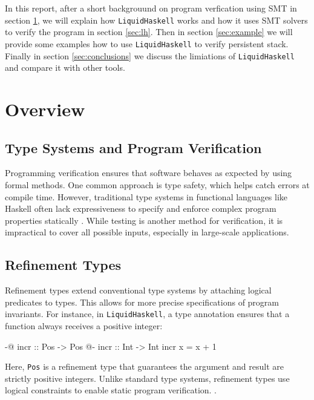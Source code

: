 \documentclass[]{rptuseminar}
\begin{document}
In this report, after a short backgrouund on program verfication using SMT in section \ref{sec:background}, we will explain 
how \texttt{LiquidHaskell} works and how it uses SMT solvers to 
verify the program in section \ref{sec:lh}. Then in section \ref{sec:example} we will provide some examples how to use 
\texttt{LiquidHaskell} to verify persistent stack. Finally in section \ref{sec:conclusions} we 
discuss the limiations of \texttt{LiquidHaskell} and compare it with other tools.


\section{Overview}
\label{sec:background}

\subsection{Type Systems and Program Verification}
Programming verification ensures that software behaves as expected by using formal methods. 
One common approach is type safety, which helps catch errors at compile time. 
However, traditional type systems in functional languages like Haskell often lack expressiveness 
to specify and enforce complex program properties statically \cite{jhala_programming_2020}. 
While testing is another method for verification, 
it is impractical to cover all possible inputs, especially in large-scale applications.

\subsection{Refinement Types}
Refinement types extend conventional type systems by attaching logical predicates to types. 
This allows for more precise specifications of program invariants. 
For instance, in \texttt{LiquidHaskell}, a type annotation ensures that a function always receives a positive integer:

\begin{haskell}
{-@ incr :: Pos -> Pos @-}
incr :: Int -> Int
incr x = x + 1
\end{haskell}

Here, \texttt{Pos} is a refinement type that guarantees the argument and result are strictly positive integers. 
Unlike standard type systems, refinement types use logical constraints to enable static program verification.
\cite{vazou_refinement_2014}.
\end{document}

